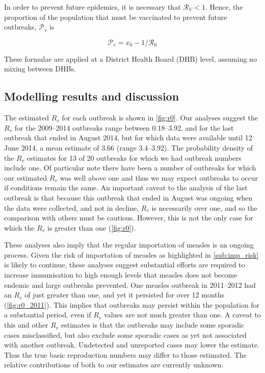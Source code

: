 \documentclass{article}
\newcommand{\Ro}{\mathcal{R}_0}
\newcommand{\Pv}{\mathcal{P}_v}
\newcommand{\Rr}{\mathcal{R}}
\begin{document}
In order to prevent future epidemics, it is necessary that $\Rr_V<1$. Hence, the proportion of the population that must be vaccinated to prevent future outbreaks, $\Pv$ is

\begin{equation} \label{eq:prop}
\Pv = x_0-1/\Ro
\end{equation}

These formulae are applied at a District Health Board (DHB) level, assuming no mixing between DHBs.

\subsection{Modelling results and discussion}

The estimated $R_v$ for each outbreak is shown in \autoref{fig:r0}. Our analyses suggest the $R_v$ for the 2009--2014 outbreaks range between 0.18--3.92, and for the last outbreak that ended in August 2014, but for which data were available until 12 June 2014, a mean estimate of 3.66 (range 3.4--3.92). The probability density of the $R_v$ estimates for 13 of 20 outbreaks for which we had outbreak numbers include one. Of particular note there have been a number of outbreaks for which our estimated $R_v$ was well above one and thus we may expect outbreaks to occur if conditions remain the same. An important caveat to the analysis of the last outbreak is that because this outbreak that ended in August was ongoing when the data were collected, and not in decline, $R_v$ is necessarily over one, and so the comparison with others must be cautious. However, this is not the only case for which the $R_v$ is greater than one (\autoref{fig:r0}).

These analyses also imply that the regular importation of measles is an ongoing process. Given the risk of importation of measles as highlighted in \autoref{sub:imp_risk} is likely to continue, these analyses suggest substantial efforts are required to increase immunisation to high enough levels that measles does not become endemic and large outbreaks prevented. One measles outbreak in 2011--2012 had an $R_v$ of just greater than one, and yet it persisted for over 12 months (\autoref{fig:r0_2011}). This implies that outbreaks may persist within the population for a substantial period, even if $R_v$ values are not much greater than one. A caveat to this and other $R_v$ estimates is that the outbreaks may include some sporadic cases misclassified, but also exclude some sporadic cases as yet not associated with another outbreak. Undetected and unreported cases may lower the estimate. Thus the true basic reproduction numbers may differ to those estimated. The relative contributions of both to our estimates are currently unknown. 
\end{document}
